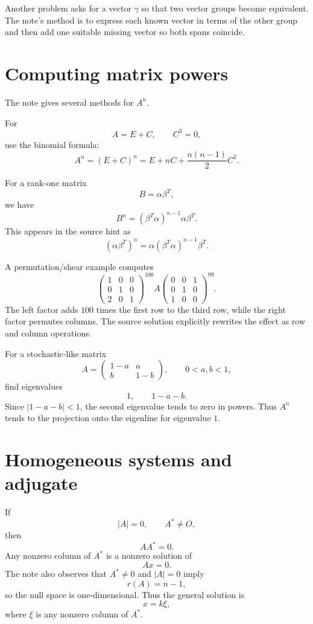 Another problem asks for a vector $\gamma$ so that two vector groups become equivalent.  The note's method is to express each known vector in terms of the other group and then add one suitable missing vector so both spans coincide.

\section{Computing matrix powers}

The note gives several methods for $A^n$.

For
\[
  A=E+C,\qquad C^3=0,
\]
use the binomial formula:
\[
  A^n=(E+C)^n=E+nC+
\frac{n(n-1)}2C^2.
\]

For a rank-one matrix
\[
  B=\alpha\beta^T,
\]
we have
\[
  B^n=(\beta^T\alpha)^{n-1}\alpha\beta^T.
\]
This appears in the source hint as
\[
  (\alpha\beta^T)^n=\alpha(\beta^T\alpha)^{n-1}\beta^T.
\]

A permutation/shear example computes
\[
  \begin{pmatrix}1&0&0\\0&1&0\\2&0&1\end{pmatrix}^{100}
  A
  \begin{pmatrix}0&0&1\\0&1&0\\1&0&0\end{pmatrix}^{99}.
\]
The left factor adds $100$ times the first row to the third row, while the right factor permutes columns.  The source solution explicitly rewrites the effect as row and column operations.

For a stochastic-like matrix
\[
  A=\begin{pmatrix}1-a&a\\b&1-b\end{pmatrix},\qquad 0<a,b<1,
\]
find eigenvalues
\[
  1,\qquad 1-a-b.
\]
Since $|1-a-b|<1$, the second eigenvalue tends to zero in powers.  Thus $A^n$ tends to the projection onto the eigenline for eigenvalue $1$.

\section{Homogeneous systems and adjugate}

If
\[
  |A|=0,\qquad A^*\ne O,
\]
then
\[
  AA^*=0.
\]
Any nonzero column of $A^*$ is a nonzero solution of
\[
  Ax=0.
\]
The note also observes that $A^*\ne0$ and $|A|=0$ imply
\[
  r(A)=n-1,
\]
so the null space is one-dimensional.  Thus the general solution is
\[
  x=k\xi,
\]
where $\xi$ is any nonzero column of $A^*$.

